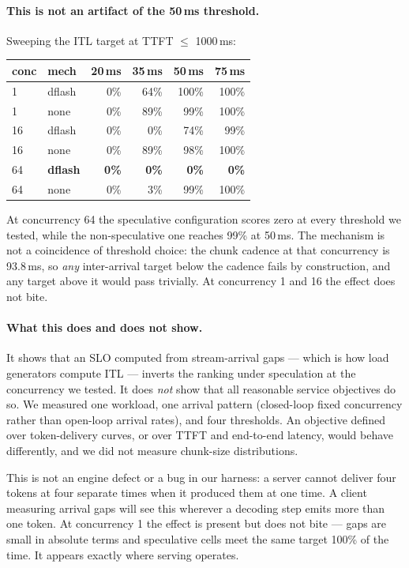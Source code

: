 \documentclass[11pt]{article}
\begin{document}
\paragraph{This is not an artifact of the 50\,ms threshold.} Sweeping the
ITL target at TTFT $\le$ 1000\,ms:

\begin{table}[h]\centering\small
\begin{tabular}{llrrrr}
\toprule
conc & mech & 20\,ms & 35\,ms & 50\,ms & 75\,ms\\
\midrule
1 & dflash & 0\% & 64\% & 100\% & 100\%\\
1 & none & 0\% & 89\% & 99\% & 100\%\\
16 & dflash & 0\% & 0\% & 74\% & 99\%\\
16 & none & 0\% & 89\% & 98\% & 100\%\\
64 & \textbf{dflash} & \textbf{0\%} & \textbf{0\%} & \textbf{0\%} & \textbf{0\%}\\
64 & none & 0\% & 3\% & 99\% & 100\%\\
\bottomrule
\end{tabular}
\end{table}

\noindent
At concurrency 64 the speculative configuration scores zero at every
threshold we tested, while the non-speculative one reaches 99\% at 50\,ms.
The mechanism is not a coincidence of threshold choice: the chunk cadence at
that concurrency is 93.8\,ms, so \emph{any} inter-arrival target below the
cadence fails by construction, and any target above it would pass
trivially. At concurrency 1 and 16 the effect does not bite.

\paragraph{What this does and does not show.} It shows that an SLO computed
from stream-arrival gaps --- which is how load generators compute ITL ---
inverts the ranking under speculation at the concurrency we tested. It does
\emph{not} show that all reasonable service objectives do so. We measured
one workload, one arrival pattern (closed-loop fixed concurrency rather than
open-loop arrival rates), and four thresholds. An objective defined over
token-delivery curves, or over TTFT and end-to-end latency, would behave
differently, and we did not measure chunk-size distributions.

This is not an engine defect or a bug in our harness: a server cannot deliver
four tokens at four separate times when it produced them at one time. A
client measuring arrival gaps will see this wherever a decoding step emits
more than one token. At concurrency 1 the
effect is present but does not bite --- gaps are small in absolute terms and
speculative cells meet the same target 100\% of the time. It appears exactly
where serving operates.
\end{document}
